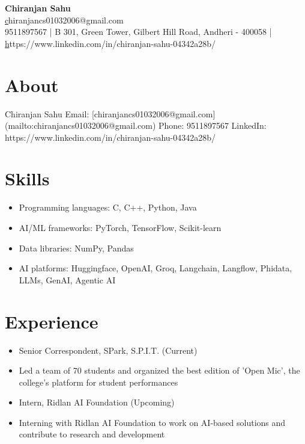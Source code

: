 \documentclass[10pt]{article}
\begin{document}
\begin{center}
    {\Huge \textbf{ Chiranjan Sahu }}\\
    \vspace{0.2cm}
    \href{mailto:chiranjancs01032006@gmail.com}chiranjancs01032006@gmail.com \\
    9511897567 | B 301, Green Tower, Gilbert Hill Road, Andheri - 400058 | \href{https://https://www.linkedin.com/in/chiranjan-sahu-04342a28b/}https://www.linkedin.com/in/chiranjan-sahu-04342a28b/
\end{center}

\section*{About}
Chiranjan Sahu Email: [chiranjancs01032006@gmail.com](mailto:chiranjancs01032006@gmail.com) Phone: 9511897567 LinkedIn: https://www.linkedin.com/in/chiranjan-sahu-04342a28b/


\section*{Skills}
\begin{itemize}[leftmargin=*]

  \item Programming languages: C, C++, Python, Java

  \item AI/ML frameworks: PyTorch, TensorFlow, Scikit-learn

  \item Data libraries: NumPy, Pandas

  \item AI platforms: Huggingface, OpenAI, Groq, Langchain, Langflow, Phidata, LLMs, GenAI, Agentic AI

\end{itemize}



\section*{Experience}
\begin{itemize}[leftmargin=*]

  \item Senior Correspondent, SPark, S.P.I.T. (Current)

  \item Led a team of 70 students and organized the best edition of 'Open Mic', the college's platform for student performances

  \item Intern, Ridlan AI Foundation (Upcoming)

  \item Interning with Ridlan AI Foundation to work on AI-based solutions and contribute to research and development

\end{itemize}
\end{document}
